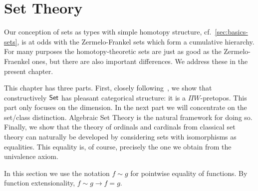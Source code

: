 \chapter{Set Theory}
\label{cha:set-math}

Our conception of sets as types with simple homotopy structure, cf.\
\autoref{sec:basics-sets}, is at odds with the Zermelo-Frankel sets which form a
cumulative hierarchy. For many purposes the homotopy-theoretic sets are just as good as
the Zermelo-Fraenkel ones, but there are also important differences. We address these in
the present chapter. 

This chapter has three parts. First, closely following~\cite{RijkeSpitters}, we show that constructively $\mathsf{Set}$ has pleasant categorical
structure: it is a $\Pi W$-pretopos. This part only focuses on the dimension. In the next part we will concentrate on the set/class
distinction. Algebraic Set
Theory is the natural framework for doing so. Finally, we show that the theory of ordinals and cardinals from classical set theory can
naturally be developed by considering sets with isomorphisms as equalities. This equality is, of course, precisely the one we obtain from
the univalence axiom.

In this section we use the notation $f\sim g$ for pointwise equality of functions. By function extensionality, $f\sim g\to f=g$.

